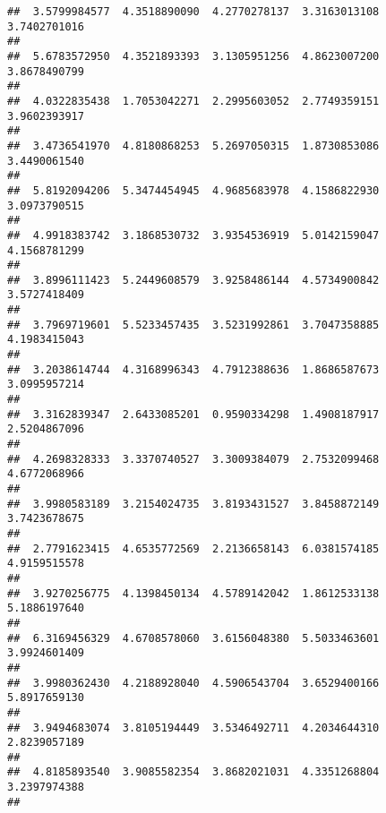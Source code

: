 \documentclass[]{article}
\begin{document}
\begin{verbatim}
##  3.5799984577  4.3518890090  4.2770278137  3.3163013108  3.7402701016 
##                                                                       
##  5.6783572950  4.3521893393  3.1305951256  4.8623007200  3.8678490799 
##                                                                       
##  4.0322835438  1.7053042271  2.2995603052  2.7749359151  3.9602393917 
##                                                                       
##  3.4736541970  4.8180868253  5.2697050315  1.8730853086  3.4490061540 
##                                                                       
##  5.8192094206  5.3474454945  4.9685683978  4.1586822930  3.0973790515 
##                                                                       
##  4.9918383742  3.1868530732  3.9354536919  5.0142159047  4.1568781299 
##                                                                       
##  3.8996111423  5.2449608579  3.9258486144  4.5734900842  3.5727418409 
##                                                                       
##  3.7969719601  5.5233457435  3.5231992861  3.7047358885  4.1983415043 
##                                                                       
##  3.2038614744  4.3168996343  4.7912388636  1.8686587673  3.0995957214 
##                                                                       
##  3.3162839347  2.6433085201  0.9590334298  1.4908187917  2.5204867096 
##                                                                       
##  4.2698328333  3.3370740527  3.3009384079  2.7532099468  4.6772068966 
##                                                                       
##  3.9980583189  3.2154024735  3.8193431527  3.8458872149  3.7423678675 
##                                                                       
##  2.7791623415  4.6535772569  2.2136658143  6.0381574185  4.9159515578 
##                                                                       
##  3.9270256775  4.1398450134  4.5789142042  1.8612533138  5.1886197640 
##                                                                       
##  6.3169456329  4.6708578060  3.6156048380  5.5033463601  3.9924601409 
##                                                                       
##  3.9980362430  4.2188928040  4.5906543704  3.6529400166  5.8917659130 
##                                                                       
##  3.9494683074  3.8105194449  3.5346492711  4.2034644310  2.8239057189 
##                                                                       
##  4.8185893540  3.9085582354  3.8682021031  4.3351268804  3.2397974388 
##                                                                       

\end{verbatim}
\end{document}
